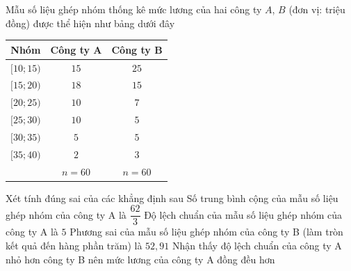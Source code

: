 \begin{ex}%
	Mẫu số liệu ghép nhóm thống kê mức  lương của hai công ty $A$, $B$ (đơn vị: triệu đồng) được thể hiện như bảng dưới đây
	\begin{longtable}{|c|c|c|}
		\hline 
		Nhóm & Công ty A & Công ty B\\ 
		\hline 
		$[10;15)$ & $15$  & $25$\\
		 \hline
		 $[15;20)$ & $18$ & $15$\\
		\hline 
		 $[20;25)$ & $10$ & $7$\\
		\hline 
		$[25;30)$ & $10$ & $5$\\ 
		 \hline
		$[30;35)$  & $5$ & $5$\\
		\hline 
		$[35;40)$  & $2$ & $3$\\
		\hline 
		 & $n=60$ & $n=60$\\
		\hline 
	\end{longtable}
	Xét tính đúng sai  của các khẳng định sau
	 \choiceTF
		{\True Số trung bình cộng của mẫu số liệu ghép nhóm của công  ty A là $\dfrac{62}{3}$}
		{Độ lệch chuẩn của mẫu số liệu ghép nhóm của công ty A là  $ 5$}
		{Phương sai của mẫu số liệu ghép  nhóm của công ty B (làm tròn kết quả đến hàng phần trăm) là $ 52{,}91$}
		{\True Nhận thấy độ lệch chuẩn của công ty A nhỏ hơn công ty B nên mức lương của công ty  A đồng đều hơn}
\end{ex}
